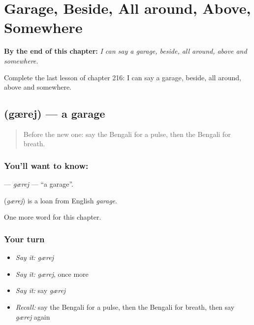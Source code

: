 
\chapter{Garage, Beside, All around, Above, Somewhere}
\label{ch:bn-garage-beside-all-around-above-somewhere}

\begin{chapteropening}
\textbf{By the end of this chapter:} \emph{I can say a garage, beside, all around, above and somewhere.}

Complete the last lesson of chapter 216: I can say a garage, beside, all around, above and somewhere.
\end{chapteropening}

\section[\texorpdfstring{\bn{গ্যারেজ} (gærej)}{গ্যারেজ (gærej)}]{ (gærej) — a garage}

\label{lesson:BN-C216-grej}



\begin{quote}
Before the new one: say the Bengali for a pulse, then the Bengali for breath.
\end{quote}

\subsection*{You'll want to know: }
\textbf{} — \emph{gærej} — \textquotedblleft{}a garage\textquotedblright{}.

\begin{cousinweb}
\textbf{} (\emph{gærej}) is a loan from English \emph{garage}.
\end{cousinweb}

\begin{grammarlens}[title={What you've built}]
One more word for this chapter.
\end{grammarlens}

\subsection*{Your turn}
\begin{itemize}
\raggedright
  \item \emph{Say it:} \emph{gærej}
  \item \emph{Say it:} \emph{gærej}, once more
  \item \emph{Say it:} say \emph{gærej}
  \item \emph{Recall:} say the Bengali for a pulse, then the Bengali for breath, then say \emph{gærej} again
\end{itemize}

